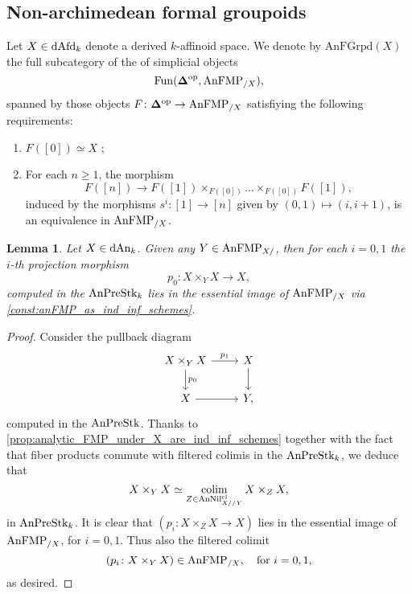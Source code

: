 \documentclass[10pt,a4paper,reqno]{amsart} %
\theoremstyle{plain}
\newtheorem{lem}[thm]{Lemma}
\theoremstyle{definition}
\theoremstyle{remark}
\numberwithin{equation}{section}
\begin{document}
\subsection{Non-archimedean formal groupoids}
Let $X \in \mathrm{dAfd}_k$ denote a derived $k$-affinoid space. We denote by
$\mathrm{AnFGrpd}(X)$ the full subcategory of the \infcat of simplicial objects
    \[
        \operatorname{Fun}( \bm{\Delta} ^\mathrm{op}, \mathrm{AnFMP}_{/X}),
    \]
spanned by those objects $F \colon \mathbf \Delta ^\mathrm{op} \to \mathrm{AnFMP}_{/X}$ satisfiying the following requirements:
    \begin{enumerate}
        \item $F([0]) \simeq X$ ;
        \item For each $n \ge 1$, the morphism
            \[
                F([n]) \to F([1]) \times_{F([0])} \dots \times_{F([0])} F([1])  ,
            \]
        induced by the morphisms $s^i \colon [1] \to [n]$ given by $(0,1) \mapsto (i, i+1)$, is an equivalence
        in $\mathrm{AnFMP}_{/X}$.
    \end{enumerate}

\begin{lem} \label{formal_moduli_under_induce_formal_moduli_over_via_base_change}
    Let $X \in \mathrm{dAn}_k$. Given any $Y \in \mathrm{AnFMP}_{X/ }$, then for each $i= 0, 1$ the $i$-th projection morphism
        \[
            p_0 \colon X \times_Y X \to X,  
        \]
    computed in the \infcat $\mathrm{AnPreStk}_k$ lies in the essential image of $\mathrm{AnFMP}_{/X}$ via \cref{const:anFMP_as_ind_inf_schemes}.
\end{lem}

\begin{proof}
    Consider the pullback diagram
        \[
        \begin{tikzcd}
            X \times_Y X \ar{r}{p_1} \ar{d}{p_0} & X \ar{d} \\
            X \ar{r} & Y ,
        \end{tikzcd}
        \]
    computed in the \infcat $\mathrm{AnPreStk}$. Thanks to \cref{prop:analytic_FMP_under_X_are_ind_inf_schemes} together with the fact that fiber products commute with filtered colimis in the \infcat $\mathrm{AnPreStk}_k$,
    we deduce that
        \[
            X \times_Y X \simeq \operatorname*{colim}_{Z \in \mathrm{AnNil}^{\mathrm{cl}}_{X//Y}} X \times_Z X, 
        \]
    in $\mathrm{AnPreStk}_k$. It is clear that $(p_i \colon X \times_Z X \to X)$ lies in the essential image of $ \mathrm{AnFMP}_{/X}$, for $i = 0, 1$. Thus also the filtered colimit
        \[
            (p_i \colon X \times_Y X ) \in \mathrm{AnFMP}_{/X}, \quad \mathrm{for \ } i = 0, 1,
        \]  
    as desired.
\end{proof}
\end{document}
